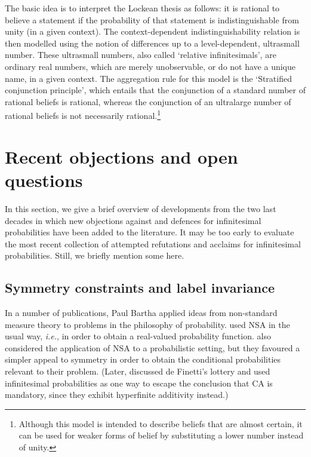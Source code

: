 The basic idea is to interpret the Lockean thesis as follows: it is rational to believe a statement if the probability of that statement is indistinguishable from unity (in a given context). The context-dependent indistinguishability relation is then modelled using the notion of differences up to a level-dependent, ultrasmall number. These ultrasmall numbers, also called `relative infinitesimals', are ordinary real numbers, which are merely unobservable, or do not have a unique name, in a given context. The aggregation rule for this model is the `Stratified conjunction principle', which entails that the conjunction of a standard number of rational beliefs is rational, whereas the conjunction of an ultralarge number of rational beliefs is not necessarily rational.\footnote{Although this model is intended to describe beliefs that are almost certain, it can be used for weaker forms of belief by substituting a lower number instead of unity.}

\section{Recent objections and open questions}\label{sec:objections}
In this section, we give a brief overview of developments from the two last decades in which new objections against and defences for infinitesimal probabilities have been added to the literature. It may be too early to evaluate the most recent collection of attempted refutations and acclaims for infinitesimal probabilities. Still, we briefly mention some here. \citet[More discussion can be found in ][]{Benci_etal:2018}

\subsection{Symmetry constraints and label invariance}\label{sec:symm}
In a number of publications, Paul Bartha applied ideas from non-standard measure theory to problems in the philosophy of probability.
\citet{BarthaHitchcock:1999} used NSA in the usual way, \textit{i.e.}, in order to obtain a real-valued probability function.
\citet{BarthaJohns:2001} also considered the application of NSA to a probabilistic setting, but they favoured a simpler appeal to symmetry in order to obtain the conditional probabilities relevant to their problem.
(Later, \citet{Bartha:2004} discussed de Finetti's lottery and used infinitesimal probabilities as one way to escape the conclusion that CA is mandatory, since they exhibit hyperfinite additivity instead.)

